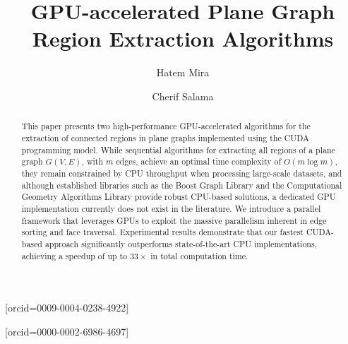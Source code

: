 \documentclass[a4paper,fleqn]{cas-sc}
\begin{document}
\let\WriteBookmarks\relax
\def\floatpagepagefraction{1}
\def\textpagefraction{.001}

\title [mode = title]{GPU-accelerated Plane Graph Region Extraction Algorithms}


\author[1]{Hatem Mira}
[orcid=0009-0004-0238-4922]
\cormark[1]


\author[1]{Cherif Salama}
[orcid=0000-0002-6986-4697]
\cormark[2]




\begin{abstract}
This paper presents two high-performance GPU-accelerated algorithms for the extraction of connected regions in plane graphs implemented using the CUDA programming model. While sequential algorithms for extracting all regions of a plane graph $G(V, E)$, with $m$ edges, achieve an optimal time complexity of $O(m \log m)$, they remain constrained by CPU throughput when processing large-scale datasets, and although established libraries such as the Boost Graph Library and the Computational Geometry Algorithms Library provide robust CPU-based solutions, a dedicated GPU implementation currently does not exist in the literature. We introduce a parallel framework that leverages GPUs to exploit the massive parallelism inherent in edge sorting and face traversal.  Experimental results demonstrate that our fastest CUDA-based approach significantly outperforms state-of-the-art CPU implementations, achieving a speedup of up to $33\times$ in total computation time.
\end{abstract}
\end{document}

